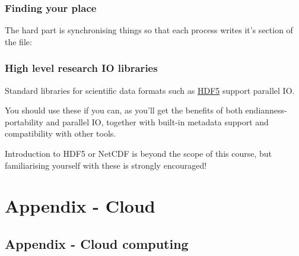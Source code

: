 \subsubsection{Finding your place}\label{finding-your-place}

The hard part is synchronising things so that each process writes it's
section of the file:

\begin{Shaded}
\begin{Highlighting}[]

    \NormalTok{* }\NormalTok{(}\NormalTok{) +                                      }
               \NormalTok{(}\NormalTok{) +          }
               \NormalTok{(}\NormalTok{); }

\end{Highlighting}
\end{Shaded}

\subsubsection{High level research IO
libraries}\label{high-level-research-io-libraries}

Standard libraries for scientific data formats such as
\href{http://www.hdfgroup.org/HDF5/}{HDF5} support parallel IO.

You should use these if you can, as you'll get the benefits of both
endianness-portability and parallel IO, together with built-in metadata
support and compatibility with other tools.

Introduction to HDF5 or NetCDF is beyond the scope of this course, but
familiarising yourself with these is strongly encouraged!

\section{Appendix - Cloud}\label{appendix---cloud}

\subsection{Appendix - Cloud
computing}\label{appendix---cloud-computing}

